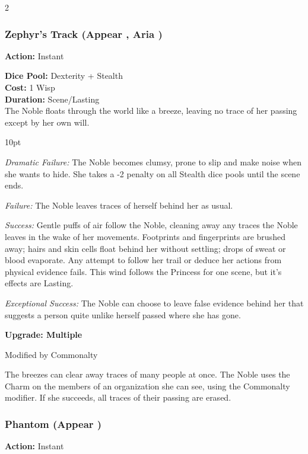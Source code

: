 \begin{multicols}{2}
\subsubsection*{Zephyr’s Track  (Appear \textbullet, Aria \textbullet )}

\noindent \textbf{Action:} Instant

\noindent \textbf{Dice Pool:} Dexterity + Stealth \\

\noindent \textbf{Cost:} 1 Wisp\\

\noindent \textbf{Duration:} Scene/Lasting \\

\noindent The Noble floats through the world like a breeze, leaving no trace of her passing except by her own will.

\begin{myindentpar}{10pt}

\emph{Dramatic Failure:} The Noble becomes clumsy, prone to slip and make noise when she wants to hide. She takes a -2 penalty on all Stealth dice pools until the scene ends.

\emph{Failure:} The Noble leaves traces of herself behind her as usual.

\emph{Success:} Gentle puffs of air follow the Noble, cleaning away any traces the Noble leaves in the wake of her movements. Footprints and fingerprints are brushed away; hairs and skin cells float behind her without settling; drops of sweat or blood evaporate. Any attempt to follow her trail or deduce her actions from physical evidence fails. This wind follows the Princess for one scene, but it's effects are Lasting. 

\emph{Exceptional Success:} The Noble can choose to leave false evidence behind her that suggests a person quite unlike herself passed where she has gone.

\textbf{Upgrade: Multiple}

Modified by Commonalty

The breezes can clear away traces of many people at once. The Noble uses the Charm on the members of an organization she can see, using the Commonalty modifier. If she succeeds, all traces of their passing are erased.

\end{myindentpar}

\subsubsection*{Phantom (Appear \textbullet\textbullet)}
\noindent \textbf{Action:} Instant


\end{multicols}
